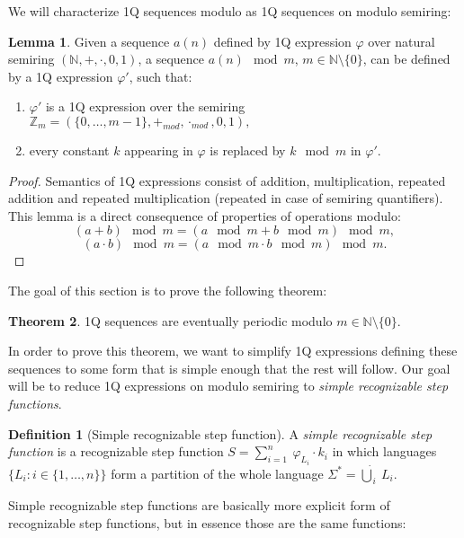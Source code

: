 \documentclass[12pt]{article}
\theoremstyle{definition}
\newtheorem{definition}{Definition}[section]
\newtheorem{theorem}{Theorem}[section]
\newtheorem{lemma}[theorem]{Lemma}
\begin{document}
We will characterize 1Q sequences modulo as 1Q sequences on modulo semiring:

\begin{lemma}
    \label{1QModulo}
    Given a sequence $a(n)$ defined by 1Q expression $\varphi$ over natural semiring $(\mathbb{N}, +, \cdot, 0, 1)$, a sequence $a(n) \mod m$, $m \in \mathbb{N} \setminus \{0\}$, can be defined by a 1Q expression $\varphi'$, such that:
    \begin{enumerate}
        \item $\varphi'$ is a 1Q expression over the semiring $\mathbb{Z}_m = (\{0,\ldots,m-1\}, +_{mod}, \cdot_{mod}, 0, 1),$
        \item every constant $k$ appearing in $\varphi$ is replaced by $k \mod m$ in $\varphi'.$
    \end{enumerate}
\end{lemma}

\begin{proof}
    Semantics of 1Q expressions consist of addition, multiplication, repeated addition and repeated multiplication (repeated in case of semiring quantifiers). This lemma is a direct consequence of properties of operations modulo:
    $$(a + b) \mod m = (a \mod m + b \mod m) \mod m,$$
    $$(a \cdot b) \mod m = (a \mod m \cdot b \mod m) \mod m.$$
\end{proof}

The goal of this section is to prove the following theorem:

\begin{theorem}
    \label{1QSequencesPeriodic}
    1Q sequences are eventually periodic modulo $m \in \mathbb{N} \setminus \{0\}$.
\end{theorem}

In order to prove this theorem, we want to simplify 1Q expressions defining these sequences to some form that is simple enough that the rest will follow. Our goal will be to reduce 1Q expressions on modulo semiring to \emph{simple recognizable step functions}.

\begin{definition}[Simple recognizable step function]
    \label{DefSimpleRecStepFun}
    A \textit{simple recognizable step function} is a recognizable step function $S = \sum_{i = 1}^{n} \ \varphi_{L_i} \cdot k_i$ in which languages $\{L_i : i \in \{1,\ldots,n\}\}$ form a partition of the whole language $\Sigma^* = \dot{\bigcup}_i \ L_i$.
\end{definition}

Simple recognizable step functions are basically more explicit form of recognizable step functions, but in essence those are the same functions:
\end{document}
